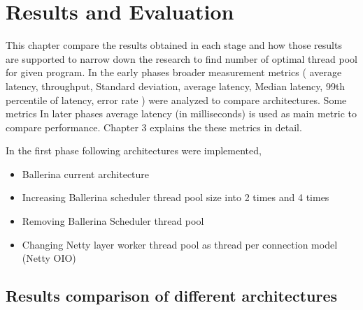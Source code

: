 \chapter{Results and Evaluation}\label{chap:5}

This chapter compare the results obtained in each stage and how those results are supported to narrow down the research to find number of optimal thread pool for given program. In the early phases broader measurement metrics ( average latency, throughput, Standard deviation, average latency, Median latency, 99th percentile of latency, error rate ) were analyzed to compare  architectures. Some metrics  In later phases average latency (in milliseconds) is used as main metric to compare performance. Chapter 3 explains the these metrics in detail.

In the first phase following architectures were implemented,

\begin{itemize}
	\item Ballerina current architecture
	\item Increasing Ballerina scheduler thread pool size into 2 times and 4 times
	\item Removing Ballerina Scheduler thread pool
	\item Changing Netty layer worker thread pool as thread per connection model  (Netty \acrshort{OIO}) 
\end{itemize}

\section{Results comparison of different architectures}

